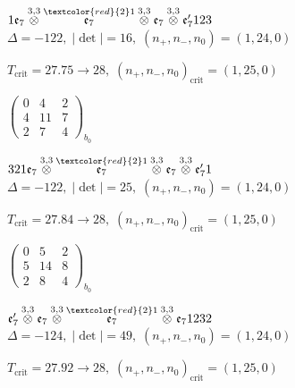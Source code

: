 \documentclass[10pt]{article}
\begin{document}
\smallskip

$1\mathfrak{e}_7\overset{3,3}{\otimes}\overset{\textcolor{red}{2}1}{\mathfrak{e}_7}\overset{3,3}{\otimes}\mathfrak{e}_7\overset{3,3}{\otimes}\mathfrak{e}_7'123$ \quad $\Delta=-122,\; |\det|=16,\; (n_+,n_-,n_0)=(1,24,0)$

\hspace{1em}$T_{\text{crit}}=27.75 \to 28,\; (n_+,n_-,n_0)_{\text{crit}}=(1,25,0)$

\hspace{2em}$\left(\begin{smallmatrix}0 & 4 & 2 \\ 4 & 11 & 7 \\ 2 & 7 & 4\end{smallmatrix}\right)_{\!b_0}$

\smallskip

$321\mathfrak{e}_7\overset{3,3}{\otimes}\overset{\textcolor{red}{2}1}{\mathfrak{e}_7}\overset{3,3}{\otimes}\mathfrak{e}_7\overset{3,3}{\otimes}\mathfrak{e}_7'1$ \quad $\Delta=-122,\; |\det|=25,\; (n_+,n_-,n_0)=(1,24,0)$

\hspace{1em}$T_{\text{crit}}=27.84 \to 28,\; (n_+,n_-,n_0)_{\text{crit}}=(1,25,0)$

\hspace{2em}$\left(\begin{smallmatrix}0 & 5 & 2 \\ 5 & 14 & 8 \\ 2 & 8 & 4\end{smallmatrix}\right)_{\!b_0}$

\smallskip

$\mathfrak{e}_7'\overset{3,3}{\otimes}\mathfrak{e}_7\overset{3,3}{\otimes}\overset{\textcolor{red}{2}1}{\mathfrak{e}_7}\overset{3,3}{\otimes}\mathfrak{e}_71232$ \quad $\Delta=-124,\; |\det|=49,\; (n_+,n_-,n_0)=(1,24,0)$

\hspace{1em}$T_{\text{crit}}=27.92 \to 28,\; (n_+,n_-,n_0)_{\text{crit}}=(1,25,0)$
\end{document}
